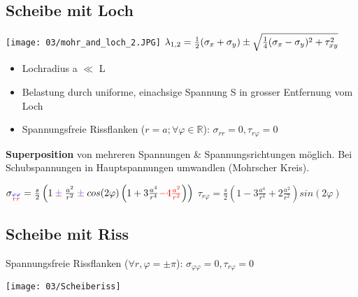     \subsection{Scheibe mit Loch}
    \vspace{-0.5mm}
        \begin{center}
            \texttt{[image: 03/mohr\_and\_loch\_2.JPG]}
            $\tiny\lambda_{1,2}= \frac{1}{2}(\sigma_x+\sigma_y)\pm\sqrt{\frac{1}{4}(\sigma_x-\sigma_y)^2+\tau_{xy}^2}$
        \end{center}
        \begin{itemize}
            \item Lochradius a $\ll$ L
            \item Belastung durch uniforme, einachsige Spannung S in grosser Entfernung vom Loch
            \item Spannungsfreie Rissflanken ($r = a; \forall\varphi\in\mathbb{R} $): $\sigma_{rr}=0, \tau_{r\varphi}=0$
        \end{itemize}
        \textbf{Superposition} von mehreren Spannungen \& Spannungsrichtungen möglich. Bei Schubspannungen in Hauptspannungen umwandlen (Mohrscher Kreis).
        \begin{center}
            $\sigma_{\overset{\textcolor{blue}{\varphi\varphi}}{\textcolor{red}{rr}}}=\frac{s}{2}\left(1\cpm\frac{a^2}{r^2}\cpm cos(2\varphi)\left(1+3\frac{a^4}{r^4}\textcolor{red}{-4\frac{a^2}{r^2}}\right)\right)$
            $\tau_{r\varphi}=\frac{s}{2}\left(1-3\frac{a^4}{r^4}+2\frac{a^2}{r^2}\right)sin(2\varphi)$
        \end{center}
        
    \subsection{Scheibe mit Riss}
        Spannungsfreie Rissflanken ($\forall r, \varphi=\pm\pi$): $\sigma_{\varphi\varphi}=0, \tau_{r\varphi}=0$
        \begin{center}
            \vspace{-2mm}
            \texttt{[image: 03/Scheiberiss]}
        \end{center}
\vspace{-2mm}